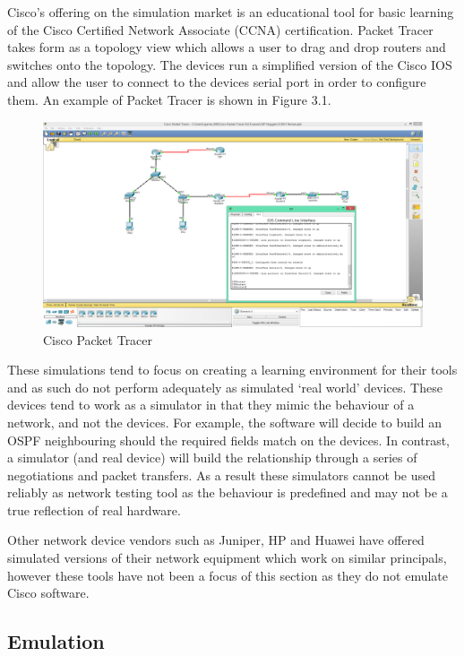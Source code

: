 \documentclass[11pt]{report}
\begin{document}
Cisco's offering on the simulation market is an educational tool for basic learning of the Cisco Certified Network Associate (CCNA) certification. Packet Tracer \citep{ciscoPacketTracer} takes form as a topology view which allows a user to drag and drop routers and switches onto the topology. The devices run a simplified version of the Cisco IOS and allow the user to connect to the devices serial port in order to configure them. An example of Packet Tracer is shown in Figure 3.1.

\begin{figure}[h!]
	\caption{Cisco Packet Tracer}
	\centering
	\includegraphics[width=1\textwidth]{packetTracer.png}
\end{figure}

 These simulations tend to focus on creating a learning environment for their tools and as such do not perform adequately as simulated `real world' devices. These devices tend to work as a simulator in that they mimic the behaviour of a network, and not the devices. For example, the software will decide to build an OSPF neighbouring should the required fields match on the devices. In contrast, a simulator (and real device) will build the relationship through a series of negotiations and packet transfers. As a result these simulators cannot be used reliably as network testing tool as the behaviour is predefined and may not be a true reflection of real hardware.
 
 Other network device vendors such as Juniper, HP and Huawei have offered simulated versions of their network equipment which work on similar principals, however these tools have not been a focus of this section as they do not emulate Cisco software.

\subsection{Emulation}
\end{document}
